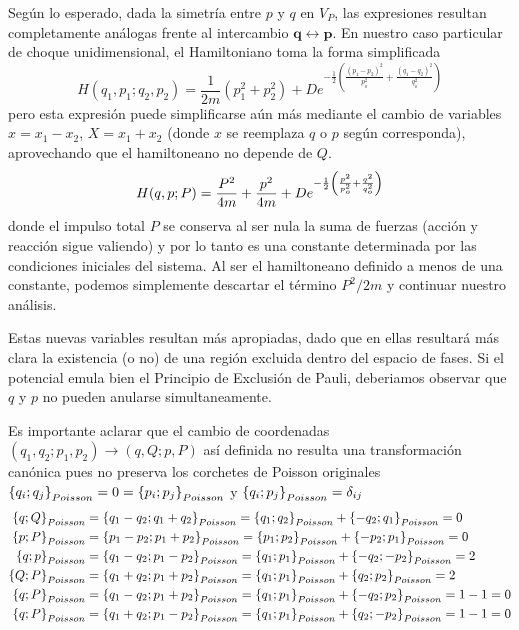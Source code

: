 Según lo esperado, dada la simetría entre $p$ y $q$ en $V_P$, las expresiones resultan completamente análogas frente al intercambio $\mathbf{q}\leftrightarrow\mathbf{p}$.
En nuestro caso particular de choque unidimensional, el Hamiltoniano toma la forma simplificada
\[ H(q_1, p_1; q_2, p_2) = \frac{1}{2m}\left( p_1^2 +p_2^2\right) + De^{-\frac{1}{2}\left(\frac{(p_1-p_2)^2}{p_o^2} + \frac{(q_1 - q_2)^2}{q_o^2}\right)} \]
pero esta expresión puede simplificarse aún más mediante el cambio de variables $x = x_1 - x_2$, $X = x_1 + x_2$ (donde $x$ se reemplaza $q$ o $p$ según corresponda), aprovechando que el hamiltoneano no depende de $Q$.
\begin{equation}{\label{eq:hamiltoniano_1D}}
H(q, p; P) = \frac{P^2}{4m} +\frac{p^2}{4m} + De^{-\frac{1}{2}\left(\frac{p^2}{p_o^2} + \frac{q^2}{q_o^2}\right)}
\end{equation}
donde el impulso total $P$ se conserva al ser nula la suma de fuerzas (acción y reacción sigue valiendo) y por lo tanto es una constante determinada por las condiciones iniciales del sistema.
Al ser el hamiltoneano definido a menos de una constante, podemos simplemente descartar el término $P^2/2m$ y continuar nuestro análisis.

Estas nuevas variables resultan más apropiadas, dado que en ellas resultará más clara la existencia (o no) de una región excluida dentro del espacio de fases.
Si el potencial emula bien el Principio de Exclusión de Pauli, deberiamos observar que $q$ y $p$ no pueden anularse simultaneamente.

Es importante aclarar que el cambio de coordenadas $(q_1,q_2;p_1,p_2)\rightarrow (q,Q;p,P)$ así definida no resulta una transformación canónica pues no preserva los corchetes de Poisson originales $\left\{q_i; q_j \right\}_{Poisson} = 0 = \left\{p_i; p_j \right\}_{Poisson}$ y $\left\{q_i; p_j \right\}_{Poisson} = \delta_{ij}$
\begin{align*}
\left\{q; Q \right\}_{Poisson} &= \left\{q_1-q_2; q_1+q_2 \right\}_{Poisson} =  \left\{q_1; q_2 \right\}_{Poisson} + \left\{-q_2; q_1 \right\}_{Poisson} = 0 \\
\left\{p; P \right\}_{Poisson} &= \left\{p_1-p_2; p_1+p_2 \right\}_{Poisson} = \left\{p_1; p_2 \right\}_{Poisson} + \left\{-p_2; p_1 \right\}_{Poisson} = 0 \\
\left\{q; p \right\}_{Poisson} &= \left\{q_1-q_2; p_1-p_2 \right\}_{Poisson} =  \left\{q_1; p_1 \right\}_{Poisson} + \left\{-q_2; -p_2 \right\}_{Poisson} = 2 \\
\left\{Q; P \right\}_{Poisson} &= \left\{q_1+q_2; p_1+p_2 \right\}_{Poisson} =  \left\{q_1; p_1 \right\}_{Poisson} + \left\{q_2; p_2 \right\}_{Poisson} = 2 \\
\left\{q; P \right\}_{Poisson} &= \left\{q_1-q_2; p_1+p_2 \right\}_{Poisson} = \left\{q_1; p_1 \right\}_{Poisson} + \left\{-q_2; p_2 \right\}_{Poisson} = 1 - 1 = 0 \\
\left\{q; P \right\}_{Poisson} &= \left\{q_1+q_2; p_1-p_2 \right\}_{Poisson} = \left\{q_1; p_1 \right\}_{Poisson} + \left\{q_2; -p_2 \right\}_{Poisson} = 1 - 1 = 0
\end{align*}

